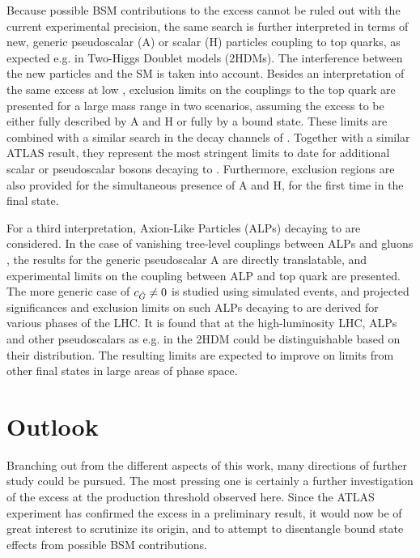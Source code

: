 Because possible BSM contributions to the excess cannot be ruled out with the current experimental precision, 
the same search is further interpreted in terms of new, generic pseudoscalar (A) or scalar (H) particles coupling to top quarks, as expected e.g. in Two-Higgs Doublet models (2HDMs). The interference between the new particles and the SM is taken into account. %
Besides an interpretation of the same excess at low \mtt, exclusion limits on the couplings to the top quark are presented for a large mass range in two scenarios, assuming the excess to be either fully described by A and H or fully by a \ttbar bound state. These limits are combined with a similar search in the \ljets decay channels of \ttbar. Together with a similar ATLAS result, they represent the most stringent limits to date for additional scalar or pseudoscalar bosons decaying to \ttbar. Furthermore, exclusion regions are also provided for the simultaneous presence of A and H, for the first time in the \ttbar final state.

For a third interpretation, Axion-Like Particles (ALPs) decaying to \ttbar are considered. In the case of vanishing tree-level couplings between ALPs and gluons \cG, the results for the generic pseudoscalar A are directly translatable, and experimental limits on the coupling between ALP and top quark are presented. The more generic case of $c_{\tilde{G}} \neq 0$ is studied using simulated events, and projected significances and exclusion limits on such ALPs decaying to \ttbar are derived for various phases of the LHC. It is found that at the high-luminosity LHC, ALPs and other pseudoscalars as e.g. in the 2HDM could be distinguishable based on their \mtt distribution. The resulting limits are expected to improve on limits from other final states in large areas of phase space.

\section{Outlook}

Branching out from the different aspects of this work, many directions of further study could be pursued. The most pressing one is certainly a further investigation of the excess at the \ttbar production threshold observed here. Since the ATLAS experiment has confirmed the excess in a preliminary result,
it would now be of great interest to scrutinize its origin, and to attempt to disentangle \ttbar bound state effects from possible BSM contributions.

